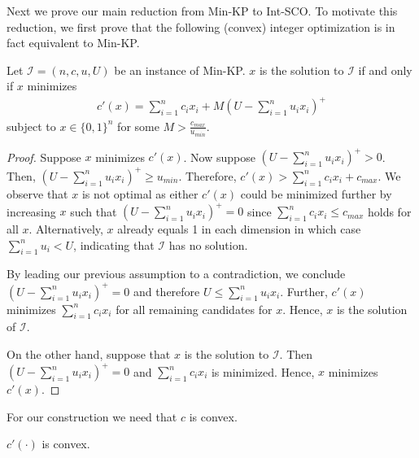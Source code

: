 Next we prove our main reduction from Min-KP to Int-SCO. To motivate this reduction, we first prove that the following (convex) integer optimization is in fact equivalent to Min-KP.

\begin{lemma}
\label{lemma:integer_minimization}
Let $\mathcal{I} = (n, c, u, U)$ be an instance of Min-KP. $x$ is the solution to $\mathcal{I}$ if and only if $x$ minimizes \begin{align*}
    c'(x) = \sum_{i=1}^n c_i x_i + M(U - \sum_{i=1}^n u_i x_i)^+
\end{align*} subject to $x \in \{0,1\}^n$ for some $M > \frac{c_{max}}{u_{min}}$.
\end{lemma}

\begin{proof}
Suppose $x$ minimizes $c'(x)$. Now suppose $(U - \sum_{i=1}^n u_i x_i)^+ > 0$. Then, $(U - \sum_{i=1}^n u_i x_i)^+ \geq u_{min}$. Therefore, $c'(x) > \sum_{i=1}^n c_i x_i + c_{max}$. We observe that $x$ is not optimal as either $c'(x)$ could be minimized further by increasing $x$ such that $(U - \sum_{i=1}^n u_i x_i)^+ = 0$ since $\sum_{i=1}^n c_i x_i \leq c_{max}$ holds for all $x$. Alternatively, $x$ already equals 1 in each dimension in which case $\sum_{i=1}^n u_i < U$, indicating that $\mathcal{I}$ has no solution.

By leading our previous assumption to a contradiction, we conclude $(U - \sum_{i=1}^n u_i x_i)^+ = 0$ and therefore $U \leq \sum_{i=1}^n u_i x_i$. Further, $c'(x)$ minimizes $\sum_{i=1}^n c_i x_i$ for all remaining candidates for $x$. Hence, $x$ is the solution of $\mathcal{I}$.

On the other hand, suppose that $x$ is the solution to $\mathcal{I}$. Then $(U - \sum_{i=1}^n u_i x_i)^+ = 0$ and $\sum_{i=1}^n c_i x_i$ is minimized. Hence, $x$ minimizes $c'(x)$.
\end{proof}

For our construction we need that $c$ is convex.

\begin{lemma}
\label{lemma:integer_minimization_convexity}
$c'(\cdot)$ is convex.
\end{lemma}

